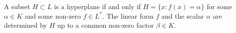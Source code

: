 A subset $H \subset L$ is a hyperplane if and only if $H = \{x : f(x) = \alpha\}$ for some $\alpha \in K$ and some non-zero $f \in L^*$. The linear form $f$ and the scalar $\alpha$ are determined by $H$ up to a common non-zero factor $\beta \in K$.
